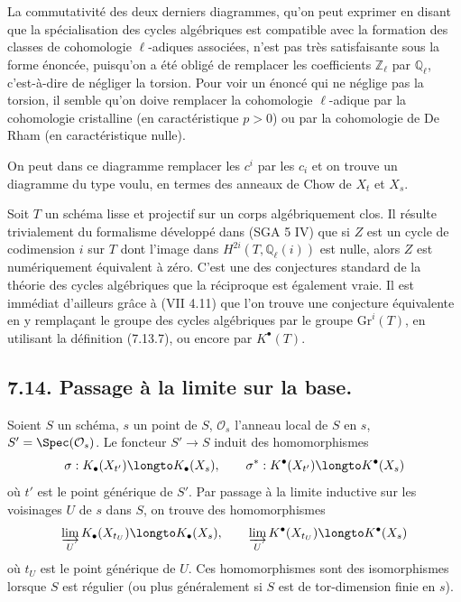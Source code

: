\begin{remarque}[7.13.11]
La commutativit\'e des deux derniers diagrammes, qu'on peut exprimer en disant que la sp\'ecialisation des cycles alg\'ebriques est compatible avec la formation des classes de cohomologie $\ell$-adiques associ\'ees, n'est pas tr\`es satisfaisante sous la forme \'enonc\'ee, puisqu'on a \'et\'e oblig\'e de remplacer les coefficients $\mathbb{Z}_{\ell}$ par $\mathbb{Q}_{\ell}$, c'est-\`a-dire de n\'egliger la torsion. Pour voir un \'enonc\'e qui ne n\'eglige pas la torsion, il semble qu'on doive remplacer la cohomologie $\ell$-adique par la cohomologie cristalline (en caract\'eristique $p > 0$) ou par la cohomologie de De Rham (en caract\'eristique nulle).
\end{remarque}

\begin{remarque}[7.13.12]
On peut dans ce diagramme remplacer les $c^{i}$ par les $c_{i}$ et on trouve un diagramme du type voulu, en termes des anneaux de Chow de $X_{t}$ et $X_{s}$.
\end{remarque}

\begin{remarque}[7.13.13]
Soit $T$ un sch\'ema lisse et projectif sur un corps alg\'ebriquement clos. Il r\'esulte trivialement du formalisme d\'evelopp\'e dans (SGA 5 IV) que si $Z$ est un cycle de codimension $i$ sur $T$ dont l'image dans $H^{2i}(T, \mathbb{Q}_{\ell}(i))$ est nulle, alors $Z$ est num\'eriquement \'equivalent \`a z\'ero. C'est une des conjectures standard de la th\'eorie des cycles alg\'ebriques que la r\'eciproque est \'egalement vraie. Il est imm\'ediat d'ailleurs gr\^ace \`a (VII 4.11) que l'on trouve une conjecture \'equivalente en y rempla\c cant le groupe des cycles alg\'ebriques par le groupe $\mathrm{Gr}^{i}(T)$, en utilisant la d\'efinition (7.13.7), ou encore par $K^{\bullet}(T)$.
\end{remarque}

\subsection*{7.14. Passage \`a la limite sur la base.}

Soient $S$ un sch\'ema, $s$ un point de $S$, $\mathcal{O}_{s}$ l'anneau local de $S$ en $s$, $S' = \Spec(\mathcal{O}_{s})$. Le foncteur $S' \to S$ induit des homomorphismes
\[
\sigma : K_{\bullet}(X_{t'}) \longto K_{\bullet}(X_{s}), \qquad \sigma^{*} : K^{\bullet}(X_{t'}) \longto K^{\bullet}(X_{s})
\]
o\`u $t'$ est le point g\'en\'erique de $S'$. Par passage \`a la limite inductive sur les voisinages $U$ de $s$ dans $S$, on trouve des homomorphismes
\[
\varinjlim_{U} K_{\bullet}(X_{t_{U}}) \longto K_{\bullet}(X_{s}), \qquad \varinjlim_{U} K^{\bullet}(X_{t_{U}}) \longto K^{\bullet}(X_{s})
\]
o\`u $t_{U}$ est le point g\'en\'erique de $U$. Ces homomorphismes sont des isomorphismes lorsque $S$ est r\'egulier (ou plus g\'en\'eralement si $S$ est de tor-dimension finie en $s$).

